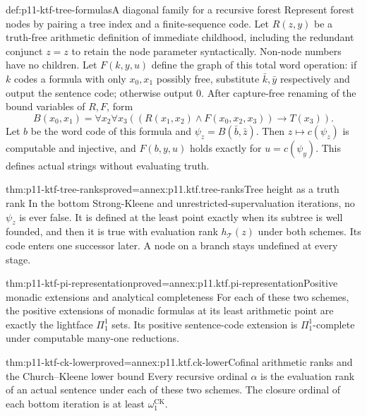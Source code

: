 \begin{hbdefinition}{def:p11-ktf-tree-formulas}{A diagonal family for a recursive forest}
Represent forest nodes by pairing a tree index and a finite-sequence code.
Let \(R(z,y)\) be a truth-free arithmetic definition of immediate
childhood, including the redundant conjunct \(z=z\) to retain the
node parameter syntactically. Non-node numbers have no children.
Let \(F(k,y,u)\) define
the graph of this total word operation: if \(k\) codes a formula with
only \(x_0,x_1\) possibly free, substitute \(\bar k,\bar y\)
respectively and output the sentence code; otherwise output \(0\).
After capture-free renaming of the bound variables of \(R,F\), form
\[
 B(x_0,x_1)=\forall x_2\forall x_3
 ((R(x_1,x_2)\land F(x_0,x_2,x_3))\to T(x_3)).
\]
Let \(b\) be the word code of this formula and
\(\psi_z=B(\bar b,\bar z)\). Then \(z\mapsto c(\psi_z)\)
is computable and injective, and \(F(b,y,u)\) holds exactly for
\(u=c(\psi_y)\). This defines actual strings without evaluating truth.
\end{hbdefinition}

\begin{hbtheorem}{thm:p11-ktf-tree-ranks}{proved=annex:p11.ktf.tree-ranks}{Tree height as a truth rank}
In the bottom Strong-Kleene and unrestricted-supervaluation iterations,
no \(\psi_z\) is ever false. It is defined at the least point exactly
when its subtree is well founded, and then it is true with evaluation
rank \(h_{\mathcal T}(z)\) under both schemes. Its code enters one
successor later. A node on a branch stays undefined at every stage.
\end{hbtheorem}

\begin{hbtheorem}{thm:p11-ktf-pi-representation}{proved=annex:p11.ktf.pi-representation}{Positive monadic extensions and analytical completeness}
For each of these two schemes, the positive extensions of monadic formulas
at its least arithmetic point are exactly the lightface \(\Pi^1_1\)
sets. Its positive sentence-code extension is \(\Pi^1_1\)-complete
under computable many-one reductions.
\end{hbtheorem}

\begin{hbtheorem}{thm:p11-ktf-ck-lower}{proved=annex:p11.ktf.ck-lower}{Cofinal arithmetic ranks and the Church--Kleene lower bound}
Every recursive ordinal \(\alpha\) is the evaluation rank of an actual
sentence under each of these two schemes. The closure ordinal of each
bottom iteration is at least \(\omega_1^{\mathrm{CK}}\).
\end{hbtheorem}

